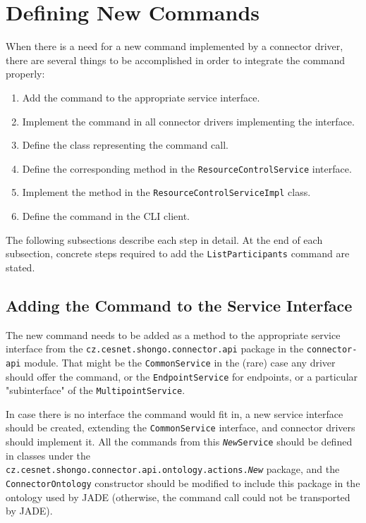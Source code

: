 \section{Defining New Commands} \label{defining-new-commands}

When there is a need for a new command implemented by a connector driver, there are several things to be accomplished in order to integrate the command properly:
\begin{enumerate}
\item Add the command to the appropriate service interface.
\item Implement the command in all connector drivers implementing the interface.
\item Define the class representing the command call.
\item Define the corresponding method in the \texttt{ResourceControlService} interface.
\item Implement the method in the \texttt{ResourceControlServiceImpl} class.
\item Define the command in the CLI client.
\end{enumerate}

The following subsections describe each step in detail. At the end of each subsection, concrete steps required to add the \texttt{ListParticipants} command are stated.


\subsection{Adding the Command to the Service Interface} \label{defining-new-commands-adding-to-service-interface}

The new command needs to be added as a method to the appropriate service interface from the \texttt{cz.cesnet.shongo.connector.api} package in the \texttt{connector-api} module. That might be the \texttt{CommonService} in the (rare) case any driver should offer the command, or the \texttt{EndpointService} for endpoints, or a particular "subinterface" of the \texttt{MultipointService}.

In case there is no interface the command would fit in, a new service interface should be created, extending the \texttt{CommonService} interface, and connector drivers should implement it. All the commands from this \texttt{\textit{New}Service} should be defined in classes under the \\\texttt{cz.cesnet.shongo.connector.api.ontology.actions.\textit{New}} package, and the \texttt{ConnectorOntology} constructor should be modified to include this package in the ontology used by JADE (otherwise, the command call could not be transported by JADE).

